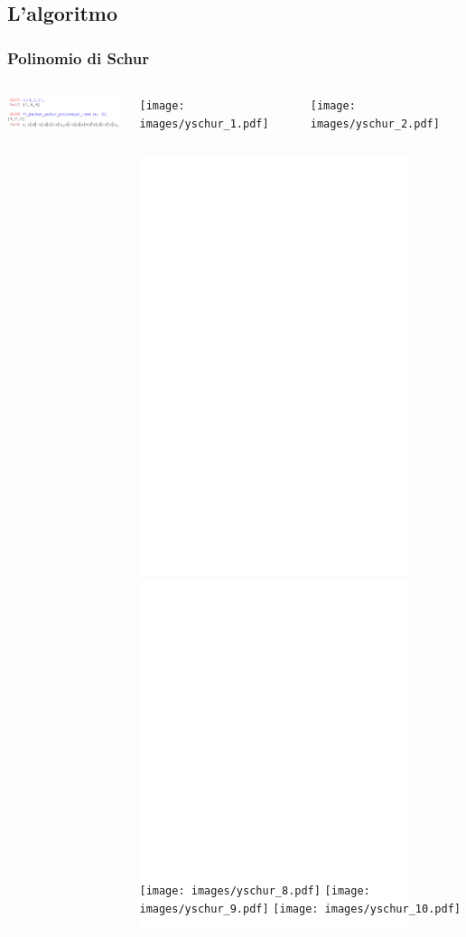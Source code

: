 \documentclass{beamer}
\begin{document}
\subsection{L'algoritmo}

\begin{frame}
\frametitle{Polinomio di Schur}
\begin{columns}[T]
\begin{column}{5cm}
\includegraphics[width=\textwidth]{images/schur_poly_demo.png}
\end{column}
\begin{column}{5cm}

\begin{columns}[T]
\begin{column}{2.5cm}
\begin{overprint}[\textwidth]
\texttt{[image: images/yschur\_1.pdf]}
\end{overprint}
\end{column}
\begin{column}{2.5cm}
\begin{overprint}[\textwidth]
\texttt{[image: images/yschur\_2.pdf]}
\end{overprint}
\end{column}
\end{columns}

\begin{overprint}[\textwidth]
\begin{columns}[b]
\column{1.66cm}
\includegraphics<4->[height=0.6\textwidth]{images/yschur_3.pdf}
\column{1.66cm}
\includegraphics<4>[height=0.6\textwidth]{images/yschur_4.pdf}
\includegraphics<5->[height=0.6\textwidth]{images/yschur_6.pdf}
\column{1.66cm}
\includegraphics<4>[height=0.6\textwidth]{images/yschur_5.pdf}
\includegraphics<5->[height=0.6\textwidth]{images/yschur_7.pdf}
\end{columns}
\end{overprint}

\begin{overprint}[\textwidth]
\begin{columns}[c]
\column{1.66cm}
\texttt{[image: images/yschur\_8.pdf]}
\column{1.66cm}
\texttt{[image: images/yschur\_9.pdf]}
\column{1.66cm}
\texttt{[image: images/yschur\_10.pdf]}
\end{columns}
\end{overprint}

\end{column}
\end{columns}
\end{frame}
\end{document}
